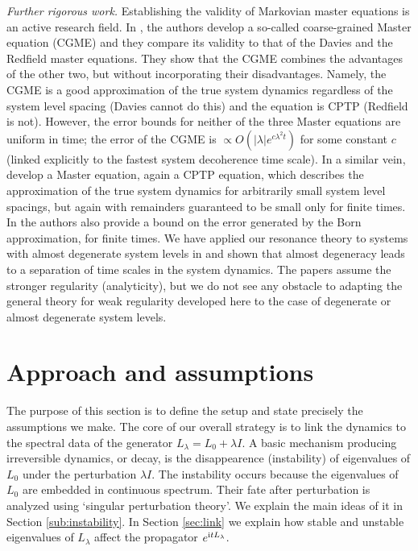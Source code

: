 \documentclass[letterpaper,onecolumn,11pt,accepted=2021-12-09]{quantumarticle}
\numberwithin{equation}{section}
\renewcommand{\i}{{\rm i}}
\begin{document}
{\em Further rigorous work.} Establishing the validity of Markovian master equations is an active research field. In \cite{ML,Majetal}, the authors develop a so-called coarse-grained Master equation (CGME) and they compare its validity to that of the Davies and the Redfield master equations. They show that the CGME combines the advantages of the other two, but without incorporating their disadvantages. Namely, the CGME is a good approximation of the true system dynamics regardless of the system level spacing (Davies cannot do this) and the equation is CPTP (Redfield is not). However, the error bounds for neither of the three Master equations are uniform in time; the error of the CGME is $\propto O(|\lambda| e^{c\lambda^2 t})$ for some constant $c$ (linked explicitly to the fastest system decoherence time scale). In a similar vein, \cite{Trush,NR} develop a Master equation, again a CPTP equation, which describes the approximation of the true system dynamics for arbitrarily small system level spacings, but again with remainders guaranteed to be small only for finite times. In \cite{NR} the authors also provide a bound on the error generated by the Born approximation, for finite times. We have applied our resonance theory to systems with almost degenerate system levels in \cite{M3level,Mtransport} and shown that almost degeneracy leads to a separation of time scales in the system dynamics. The papers \cite{M3level,Mtransport} assume the stronger regularity (analyticity), but we do not see any obstacle to adapting the general theory for weak regularity developed here to the case of degenerate or almost degenerate system levels. 









\section{Approach and assumptions}
\label{sec:setup}

The purpose of this section is to define the setup and state precisely the assumptions we make. The core of our overall strategy is to link the dynamics to the spectral data of the generator $L_\lambda=L_0+\lambda I$. A basic mechanism producing irreversible dynamics, or decay, is the disappearence (instability) of eigenvalues of $L_0$ under the perturbation $\lambda I$. The instability occurs because the eigenvalues of $L_0$ are embedded in continuous spectrum. Their fate after perturbation is analyzed using `singular perturbation theory'. We explain the main ideas of it in Section \ref{sub:instability}. In Section \ref{sec:link} we explain how stable and unstable eigenvalues of $L_\lambda$ affect the propagator $e^{\i tL_\lambda}$. 
\end{document}

